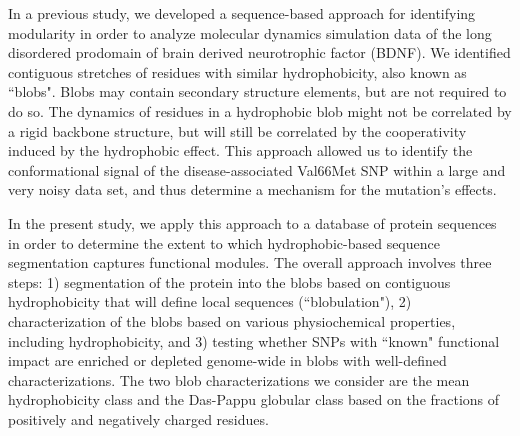 \documentclass[10pt,letterpaper]{article}
\begin{document}
In a previous study\cite{Lohia2019}, we developed a sequence-based approach for identifying modularity in order to analyze molecular dynamics simulation data of the long disordered prodomain of brain derived neurotrophic factor (BDNF). We identified contiguous stretches of residues with similar hydrophobicity, also known as ``blobs". Blobs may contain secondary structure elements, but are not required to do so. The dynamics of residues in a hydrophobic blob might not be correlated by a rigid backbone structure, but will still be correlated by the cooperativity induced by the hydrophobic effect. This approach allowed us to identify the conformational signal of the disease-associated Val66Met SNP within a large and very noisy data set, and thus determine a mechanism for the mutation's effects.  


In the present study, we apply this approach to a database of protein sequences in order to determine the extent to which hydrophobic-based sequence segmentation captures functional modules. The overall approach involves three steps: 1) segmentation of the protein into the blobs based on contiguous hydrophobicity that will define local sequences (``blobulation"), 2) characterization of the blobs based on various physiochemical properties, including hydrophobicity, and 3) testing whether SNPs with ``known" functional impact are enriched or depleted genome-wide in blobs with well-defined characterizations. The two blob characterizations we consider are the mean hydrophobicity class and the Das-Pappu globular class based on the fractions of positively and negatively charged residues.
\end{document}
